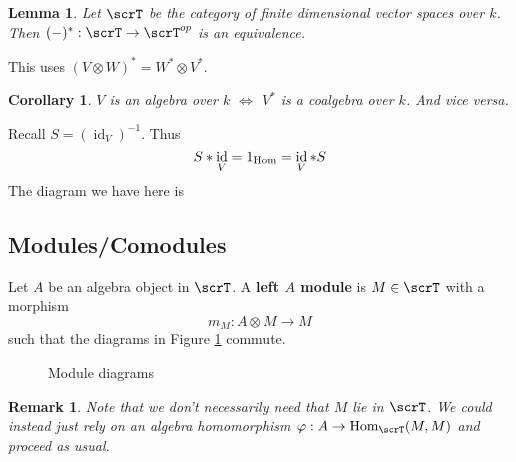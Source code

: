 \documentclass[12pt]{article}
\theoremstyle{break}
\theoremstyle{nonumberbreak}
\theoremstyle{changebreak}
\newtheorem{lem}[thm]{Lemma}
\newtheorem{cor}[thm]{Corollary}
\theoremstyle{break}
\theoremstyle{nonumberbreak}
\theoremstyle{nonumberplain}
\theoremstyle{change}
\newtheorem{rmk}[thm]{Remark}
\DeclareMathOperator{\id}{id}
\newcommand*{\Hom}{\ensuremath\text{Hom}}
\begin{document}
 \begin{lem}
	Let $\scrT$ be the category of finite dimensional vector spaces over $k$.
	Then $(-)^*:\scrT\to\scrT^{op}$ is an equivalence.
 \end{lem}
 This uses $(V\otimes W)^*=W^*\otimes V^*$.
 \begin{cor}
	$V$ is an algebra over $k$ $\Leftrightarrow$ $V^*$ is a coalgebra over $k$.
	And vice versa.
 \end{cor}

 Recall $S=(\id_V)^{-1}$. Thus
 \[S\ast \id_V=1_{\Hom}=\id_V\ast S\]
 The diagram we have here is
 \begin{figure}[h]
	 \centering
 \end{figure}

 \subsection*{Modules/Comodules}
 \begin{defn}
	Let $A$ be an algebra object in $\scrT$. A \textbf{left $A$ module} is $M\in\scrT$
	with a morphism
	\[m_M:A\otimes M\to M\]
	such that the diagrams in Figure \ref{fig-mod} commute.
\end{defn}
\begin{figure}[h]\label{fig-mod}
	\centering
	\caption{Module diagrams}
\end{figure}
\begin{rmk}
	Note that we don't necessarily need that $M$ lie in $\scrT$. We could instead just 
	rely on an algebra homomorphism $\varphi:A\to \Hom_{\scrT}(M,M)$ and proceed as usual.
\end{rmk}
\end{document}
